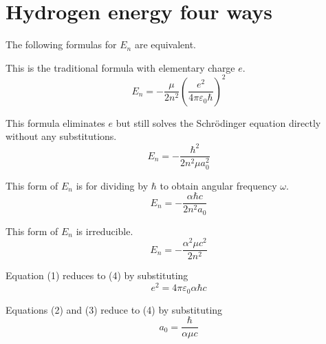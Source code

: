 

\section*{Hydrogen energy four ways}

The following formulas for $E_n$ are equivalent.

\bigskip
This is the traditional formula with elementary charge $e$.
\begin{equation*}
E_n=-\frac{\mu}{2n^2}\left(\frac{e^2}{4\pi\varepsilon_0\hbar}\right)^2
\tag{1}
\end{equation*}

This formula eliminates $e$ but still solves the Schr\"odinger equation directly
without any substitutions.
\begin{equation*}
E_n=-\frac{\hbar^2}{2n^2\mu a_0^2}
\tag{2}
\end{equation*}

This form of $E_n$ is for dividing by $\hbar$ to obtain angular frequency $\omega$.
\begin{equation*}
E_n=-\frac{\alpha\hbar c}{2n^2a_0}
\tag{3}
\end{equation*}

This form of $E_n$ is irreducible.
\begin{equation*}
E_n=-\frac{\alpha^2\mu c^2}{2n^2}
\tag{4}
\end{equation*}

Equation (1) reduces to (4) by substituting
\begin{equation*}
e^2=4\pi\varepsilon_0\alpha\hbar c
\end{equation*}

Equations (2) and (3) reduce to (4) by substituting
\begin{equation*}
a_0=\frac{\hbar}{\alpha\mu c}
\end{equation*}



